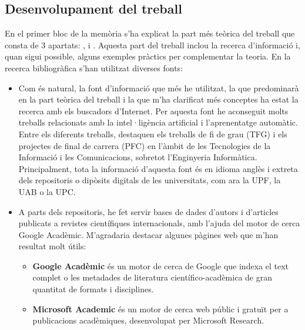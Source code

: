\begin{refsection}
\chapter{Desenvolupament del treball}

	En el primer bloc de la memòria s'ha explicat la part més teòrica del treball que consta de 3 apartats: ,  i . Aquesta part del treball inclou la recerca d'informació i, quan sigui possible, alguns exemples pràctics per complementar la teoria. En la recerca bibliogràfica s'han utilitzat diverses fonts:

	\begin{itemize}

		\item Com és natural, la font d'informació que més he utilitzat, la que predominarà en la part teòrica del treball i la que m’ha clarificat més conceptes ha estat la recerca amb els buscadors d'Internet. Per aquesta font he aconseguit molts treballs relacionats amb la intel·ligència artificial i l'aprenentatge automàtic. Entre els diferents treballs, destaquen els treballs de fi de grau (TFG) i els projectes de final de carrera (PFC) en l'àmbit de les Tecnologies de la Informació i les Comunicacions, sobretot l'Enginyeria Informàtica. Principalment, tota la informació d'aquesta font és en idioma anglès i extreta dels repositoris o dipòsits digitals de les universitats, com ara la UPF\supercite{eRepositoriUPF}, la UAB\supercite{DDDUAB} o la UPC.\supercite{UPCommons}

		\item A parts dels repositoris, he fet servir bases de dades d'autors i d'articles publicats a revistes científiques internacionals, amb l'ajuda del motor de cerca Google Acadèmic. M'agradaria destacar algunes pàgines web que m'han resultat molt útils:

		      \begin{itemize}

			      \item \textbf{Google Acadèmic} és un motor de cerca de Google que indexa el text complet o les metadades de literatura científico-acadèmica de gran quantitat de formats i disciplines.\supercite{GoogleScholar}

			      \item \textbf{Microsoft Academic} és un motor de cerca web públic i gratuït per a publicacions acadèmiques, desenvolupat per Microsoft Research.\supercite{MicrosoftAcademic}


\end{itemize}
\end{itemize}
\end{refsection}

